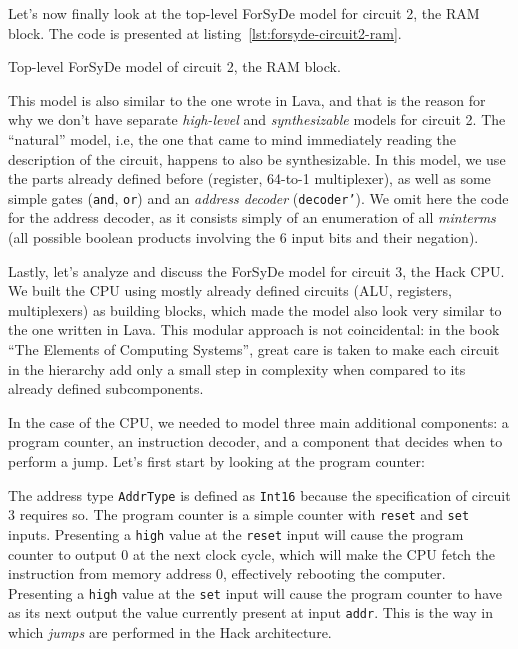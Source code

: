             Let's now finally look at the top-level ForSyDe model for circuit 2, the RAM block.  The
            code is presented at listing~\ref{lst:forsyde-circuit2-ram}.

            \begin{listing}[h!]
                \caption{Top-level ForSyDe model of circuit 2, the RAM block.
                    \label{lst:forsyde-circuit2-ram}}
            \end{listing}

            This model is also similar to the one wrote in Lava, and that is the reason for why we
            don't have separate \emph{high-level} and \emph{synthesizable} models for circuit 2. The
            ``natural'' model, i.e, the one that came to mind immediately reading the description of
            the circuit, happens to also be synthesizable. In this model, we use the parts already
            defined before (register, 64-to-1 multiplexer), as well as some simple gates
            (\texttt{and}, \texttt{or}) and an \emph{address decoder} (\texttt{decoder'}). We omit
            here the code for the address decoder, as it consists simply of an enumeration of all
            \emph{minterms} (all possible boolean products involving the 6 input bits and their
            negation).

            Lastly, let's analyze and discuss the ForSyDe model for circuit 3, the Hack CPU. We
            built the CPU using mostly already defined circuits (ALU, registers, multiplexers) as
            building blocks, which made the model also look very similar to the one written in Lava.
            This modular approach is not coincidental: in the book ``The Elements of Computing
            Systems''\cite{nand2tetris-book}, great care is taken to make each circuit in the
            hierarchy add only a small step in complexity when compared to its already defined
            subcomponents.

            In the case of the CPU, we needed to model three main additional components: a program
            counter, an instruction decoder, and a component that decides when to perform a jump.
            Let's first start by looking at the program counter:


            The address type \texttt{AddrType} is defined as \texttt{Int16} because the
            specification of circuit 3 requires so. The program counter is a simple counter with
            \texttt{reset} and \texttt{set} inputs. Presenting a \texttt{high} value at the
            \texttt{reset} input will cause the program counter to output 0 at the next clock cycle,
            which will make the CPU fetch the instruction from memory address 0, effectively
            rebooting the computer. Presenting a \texttt{high} value at the \texttt{set} input will
            cause the program counter to have as its next output the value currently present at
            input \texttt{addr}. This is the way in which \emph{jumps} are performed in the Hack
            architecture.

